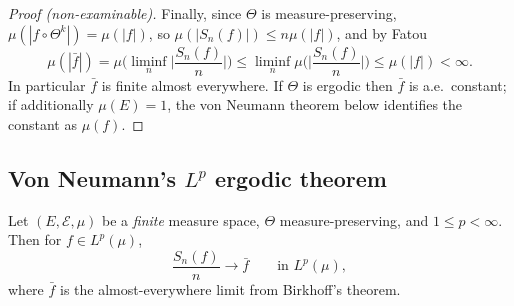 \documentclass[a4paper]{scrartcl}
\newcommand{\cE}{\mathcal{E}}
\begin{document}
\begin{proof}[Proof (non-examinable)]
	Finally, since $\Theta$ is measure-preserving, $\mu(|f\circ\Theta^k|)=\mu(|f|)$, so $\mu(|S_n(f)|)\leq n\mu(|f|)$, and by Fatou
	$$
	\mu(|\bar f|)=\mu\Big(\liminf_n\Big|\frac{S_n(f)}{n}\Big|\Big)\leq\liminf_n\mu\Big(\Big|\frac{S_n(f)}{n}\Big|\Big)\leq\mu(|f|)<\infty.
	$$
	In particular $\bar f$ is finite almost everywhere. If $\Theta$ is ergodic then $\bar f$ is a.e.\ constant; if additionally $\mu(E)=1$, the von Neumann theorem below identifies the constant as $\mu(f)$.
\end{proof}

\subsection{Von Neumann's \texorpdfstring{$L^p$}{Lp} ergodic theorem}

\begin{theorem}\label{thm:vonneumann}
	Let $(E,\cE,\mu)$ be a \emph{finite} measure space, $\Theta$ measure-preserving, and $1 \leq p<\infty$. Then for $f \in L^p(\mu)$,
	$$
	\frac{S_n(f)}{n}\longrightarrow\bar f \qquad \text{in } L^p(\mu),
	$$
	where $\bar f$ is the almost-everywhere limit from Birkhoff's theorem.
\end{theorem}
\end{document}
